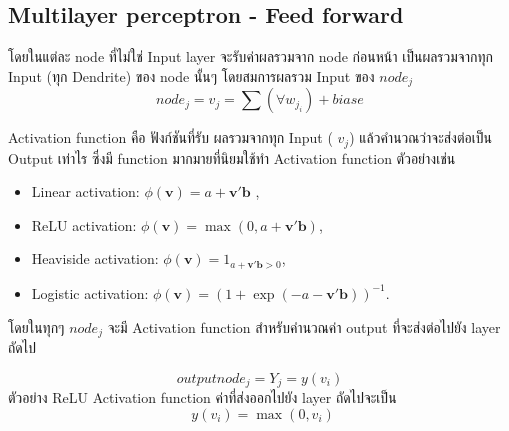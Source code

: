 \subsection{Multilayer perceptron - Feed forward \cite{Feed}}


โดยในแต่ละ node ที่ไม่ใช่ Input layer จะรับค่าผลรวมจาก node ก่อนหน้า เป็นผลรวมจากทุก Input (ทุก Dendrite) ของ node นั้นๆ
\newline
โดยสมการผลรวม Input ของ $node_j$
\begin{equation} node_j  =  v_j = \sum(\forall w_{j_i})+biase \end{equation}

Activation function \cite{Activation} คือ ฟังก์ชันที่รับ ผลรวมจากทุก Input ( $v_j $)  แล้วคำนวณว่าจะส่งต่อเป็น Output เท่าไร
ซึ่งมี function มากมายที่นิยมใช้ทำ Activation function ตัวอย่างเช่น
\begin{itemize}
  \item Linear activation:  ${\displaystyle \phi (\mathbf {v} )=a+\mathbf {v} '\mathbf {b} }$ ,
  \item ReLU activation: ${\displaystyle \phi (\mathbf {v} )=\max(0,a+\mathbf {v} '\mathbf {b} )}$,
  \item Heaviside activation: ${\displaystyle \phi (\mathbf {v} )=1_{a+\mathbf {v} '\mathbf {b} >0}}$,
  \item Logistic activation: ${\displaystyle \phi (\mathbf {v} )=(1+\exp(-a-\mathbf {v} '\mathbf {b} ))^{-1}}$.
\end{itemize}

โดยในทุกๆ $node_j$ จะมี Activation function สำหรับคำนวณค่า output ที่จะส่งต่อไปยัง layer ถัดไป

\begin{equation} output node_j =  Y_j =  y(v_i)  \end{equation}
ตัวอย่าง ReLU Activation function ค่าที่ส่งออกไปยัง layer ถัดไปจะเป็น
\begin{equation} ~~ y(v_i) = \max(0,v_i)
\end{equation}

